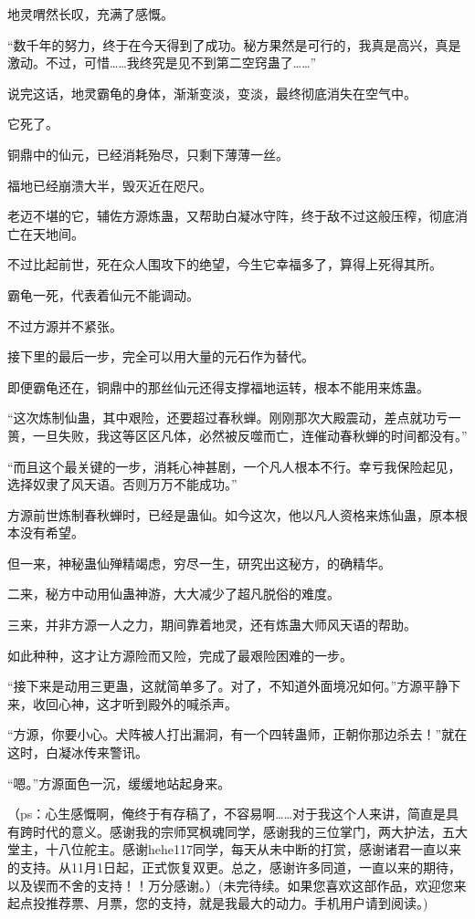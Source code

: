 \begin{this_body}
地灵喟然长叹，充满了感慨。

“数千年的努力，终于在今天得到了成功。秘方果然是可行的，我真是高兴，真是激动。不过，可惜……我终究是见不到第二空窍蛊了……”

说完这话，地灵霸龟的身体，渐渐变淡，变淡，最终彻底消失在空气中。

它死了。

铜鼎中的仙元，已经消耗殆尽，只剩下薄薄一丝。

福地已经崩溃大半，毁灭近在咫尺。

老迈不堪的它，辅佐方源炼蛊，又帮助白凝冰守阵，终于敌不过这般压榨，彻底消亡在天地间。

不过比起前世，死在众人围攻下的绝望，今生它幸福多了，算得上死得其所。

霸龟一死，代表着仙元不能调动。

不过方源并不紧张。

接下里的最后一步，完全可以用大量的元石作为替代。

即便霸龟还在，铜鼎中的那丝仙元还得支撑福地运转，根本不能用来炼蛊。

“这次炼制仙蛊，其中艰险，还要超过春秋蝉。刚刚那次大殿震动，差点就功亏一篑，一旦失败，我这等区区凡体，必然被反噬而亡，连催动春秋蝉的时间都没有。”

“而且这个最关键的一步，消耗心神甚剧，一个凡人根本不行。幸亏我保险起见，选择奴隶了风天语。否则万万不能成功。”

方源前世炼制春秋蝉时，已经是蛊仙。如今这次，他以凡人资格来炼仙蛊，原本根本没有希望。

但一来，神秘蛊仙殚精竭虑，穷尽一生，研究出这秘方，的确精华。

二来，秘方中动用仙蛊神游，大大减少了超凡脱俗的难度。

三来，并非方源一人之力，期间靠着地灵，还有炼蛊大师风天语的帮助。

如此种种，这才让方源险而又险，完成了最艰险困难的一步。

“接下来是动用三更蛊，这就简单多了。对了，不知道外面境况如何。”方源平静下来，收回心神，这才听到殿外的喊杀声。

“方源，你要小心。犬阵被人打出漏洞，有一个四转蛊师，正朝你那边杀去！”就在这时，白凝冰传来警讯。

“嗯。”方源面色一沉，缓缓地站起身来。

（ps：心生感慨啊，俺终于有存稿了，不容易啊……对于我这个人来讲，简直是具有跨时代的意义。感谢我的宗师冥枫魂同学，感谢我的三位掌门，两大护法，五大堂主，十八位舵主。感谢hehe117同学，每天从未中断的打赏，感谢诸君一直以来的支持。从11月1日起，正式恢复双更。总之，感谢许多同道，一直以来的期待，以及锲而不舍的支持！！万分感谢。）(未完待续。如果您喜欢这部作品，欢迎您来起点投推荐票、月票，您的支持，就是我最大的动力。手机用户请到阅读。)

\end{this_body}

